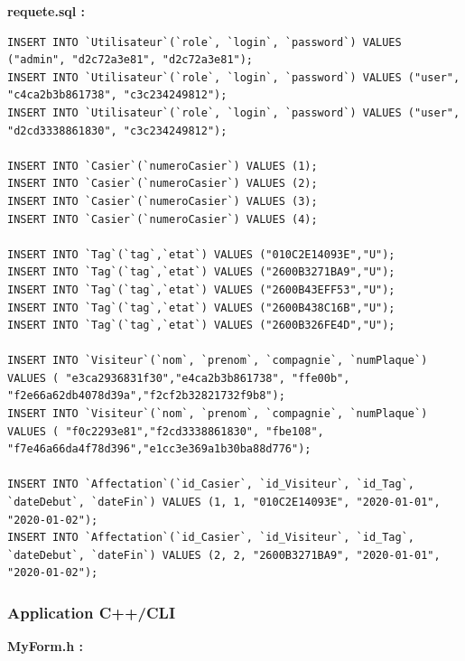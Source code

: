 \documentclass[main.tex]{subfiles}
\begin{document}
\textbf{requete.sql :}

\begin{lstlisting}
INSERT INTO `Utilisateur`(`role`, `login`, `password`) VALUES ("admin", "d2c72a3e81", "d2c72a3e81");
INSERT INTO `Utilisateur`(`role`, `login`, `password`) VALUES ("user", "c4ca2b3b861738", "c3c234249812");
INSERT INTO `Utilisateur`(`role`, `login`, `password`) VALUES ("user", "d2cd3338861830", "c3c234249812");

INSERT INTO `Casier`(`numeroCasier`) VALUES (1);
INSERT INTO `Casier`(`numeroCasier`) VALUES (2);
INSERT INTO `Casier`(`numeroCasier`) VALUES (3);
INSERT INTO `Casier`(`numeroCasier`) VALUES (4);

INSERT INTO `Tag`(`tag`,`etat`) VALUES ("010C2E14093E","U");
INSERT INTO `Tag`(`tag`,`etat`) VALUES ("2600B3271BA9","U");
INSERT INTO `Tag`(`tag`,`etat`) VALUES ("2600B43EFF53","U");
INSERT INTO `Tag`(`tag`,`etat`) VALUES ("2600B438C16B","U");
INSERT INTO `Tag`(`tag`,`etat`) VALUES ("2600B326FE4D","U");

INSERT INTO `Visiteur`(`nom`, `prenom`, `compagnie`, `numPlaque`) VALUES ( "e3ca2936831f30","e4ca2b3b861738", "ffe00b", "f2e66a62db4078d39a","f2cf2b32821732f9b8");
INSERT INTO `Visiteur`(`nom`, `prenom`, `compagnie`, `numPlaque`) VALUES ( "f0c2293e81","f2cd3338861830", "fbe108", "f7e46a66da4f78d396","e1cc3e369a1b30ba88d776");

INSERT INTO `Affectation`(`id_Casier`, `id_Visiteur`, `id_Tag`, `dateDebut`, `dateFin`) VALUES (1, 1, "010C2E14093E", "2020-01-01", "2020-01-02");
INSERT INTO `Affectation`(`id_Casier`, `id_Visiteur`, `id_Tag`, `dateDebut`, `dateFin`) VALUES (2, 2, "2600B3271BA9", "2020-01-01", "2020-01-02");
\end{lstlisting}

\subsubsection{Application C++/CLI}

\textbf{MyForm.h :}
\end{document}
